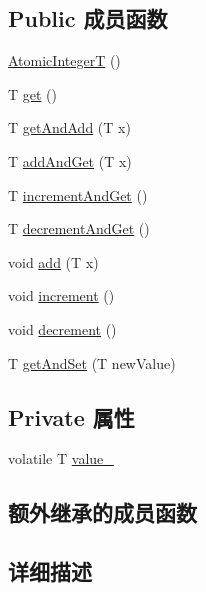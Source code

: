 \subsection*{Public 成员函数}
\begin{DoxyCompactItemize}
\item 
\hyperlink{classmuduo_1_1detail_1_1AtomicIntegerT_aa90a2eaa96df1ffa5694517542af850b}{Atomic\+IntegerT} ()
\item 
T \hyperlink{classmuduo_1_1detail_1_1AtomicIntegerT_af6ea056c8af82f08af9fd0d857967f9b}{get} ()
\item 
T \hyperlink{classmuduo_1_1detail_1_1AtomicIntegerT_acb0d3a5f2a930460bc3223b689fe8e8f}{get\+And\+Add} (T x)
\item 
T \hyperlink{classmuduo_1_1detail_1_1AtomicIntegerT_afccedf3c9d81833307c02958c2b52f1d}{add\+And\+Get} (T x)
\item 
T \hyperlink{classmuduo_1_1detail_1_1AtomicIntegerT_a7931f15feb0f7133e2873b0b4ddbcba6}{increment\+And\+Get} ()
\item 
T \hyperlink{classmuduo_1_1detail_1_1AtomicIntegerT_a943242d48a7e2a97c81651945a90f3f3}{decrement\+And\+Get} ()
\item 
void \hyperlink{classmuduo_1_1detail_1_1AtomicIntegerT_a280f2f21d67cb0811ccc97df80f1291e}{add} (T x)
\item 
void \hyperlink{classmuduo_1_1detail_1_1AtomicIntegerT_aeb2624c7a86b765725fd80cd426e147d}{increment} ()
\item 
void \hyperlink{classmuduo_1_1detail_1_1AtomicIntegerT_af998f1201f6ff5160003144e5818b8ba}{decrement} ()
\item 
T \hyperlink{classmuduo_1_1detail_1_1AtomicIntegerT_a95d28eaf6728782158ae0e654bce6680}{get\+And\+Set} (T new\+Value)
\end{DoxyCompactItemize}
\subsection*{Private 属性}
\begin{DoxyCompactItemize}
\item 
volatile T \hyperlink{classmuduo_1_1detail_1_1AtomicIntegerT_a2c8d8e24d202a511701c5e83fcbf2063}{value\+\_\+}
\end{DoxyCompactItemize}
\subsection*{额外继承的成员函数}


\subsection{详细描述}
